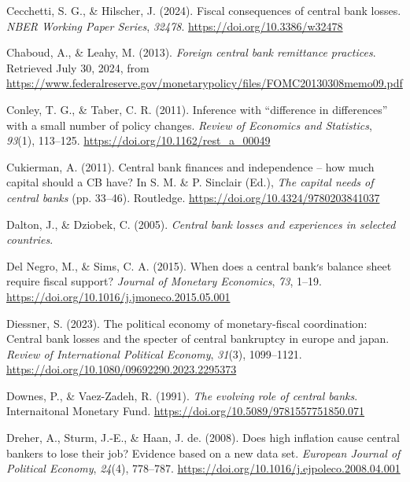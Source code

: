 \documentclass[
  a4paper,
  abstract=true]{scrartcl}
\newlength{\cslhangindent}
\newenvironment{CSLReferences}[2] %
 {\begin{list}{}{%
  \setlength{\itemindent}{0pt}
  \setlength{\leftmargin}{0pt}
  \setlength{\parsep}{0pt}
  \ifodd #1
   \setlength{\leftmargin}{\cslhangindent}
   \setlength{\itemindent}{-1\cslhangindent}
  \fi
  \setlength{\itemsep}{#2\baselineskip}}}
 {\end{list}}
\theoremstyle{definition}
\begin{document}
\begin{CSLReferences}{1}{0}
Cecchetti, S. G., \& Hilscher, J. (2024). Fiscal consequences of central
bank losses. \emph{NBER Working Paper Series}, \emph{32478}.
\url{https://doi.org/10.3386/w32478}

Chaboud, A., \& Leahy, M. (2013). \emph{Foreign central bank remittance
practices}. Retrieved July 30, 2024, from
\url{https://www.federalreserve.gov/monetarypolicy/files/FOMC20130308memo09.pdf}

Conley, T. G., \& Taber, C. R. (2011). Inference with {``difference in
differences''} with a small number of policy changes. \emph{Review of
Economics and Statistics}, \emph{93}(1), 113--125.
\url{https://doi.org/10.1162/rest_a_00049}

Cukierman, A. (2011). Central bank finances and independence -- how much
capital should a CB have? In S. M. \& P. Sinclair (Ed.), \emph{The
capital needs of central banks} (pp. 33--46). Routledge.
\url{https://doi.org/10.4324/9780203841037}

Dalton, J., \& Dziobek, C. (2005). \emph{Central bank losses and
experiences in selected countries}.

Del Negro, M., \& Sims, C. A. (2015). When does a central bank׳s balance
sheet require fiscal support? \emph{Journal of Monetary Economics},
\emph{73}, 1--19. \url{https://doi.org/10.1016/j.jmoneco.2015.05.001}

Diessner, S. (2023). The political economy of monetary-fiscal
coordination: Central bank losses and the specter of central bankruptcy
in europe and japan. \emph{Review of International Political Economy},
\emph{31}(3), 1099--1121.
\url{https://doi.org/10.1080/09692290.2023.2295373}

Downes, P., \& Vaez-Zadeh, R. (1991). \emph{The evolving role of central
banks}. Internaitonal Monetary Fund.
\url{https://doi.org/10.5089/9781557751850.071}

Dreher, A., Sturm, J.-E., \& Haan, J. de. (2008). Does high inflation
cause central bankers to lose their job? Evidence based on a new data
set. \emph{European Journal of Political Economy}, \emph{24}(4),
778--787. \url{https://doi.org/10.1016/j.ejpoleco.2008.04.001}


\end{CSLReferences}
\end{document}
